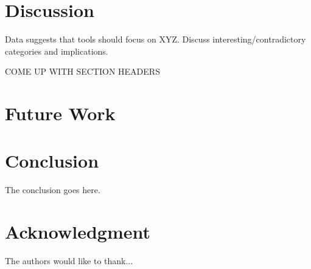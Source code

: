 \documentclass[conference]{IEEEtran}
\begin{document}
\section{Discussion}
\label{sec:disc}
Data suggests that tools should focus on XYZ. Discuss interesting/contradictory categories and implications.

COME UP WITH SECTION HEADERS


\section{Future Work}
\label{sec:fw}

\section{Conclusion}
\label{sec:concl}
The conclusion goes here.






\section*{Acknowledgment}


The authors would like to thank...




%




\end{document}
